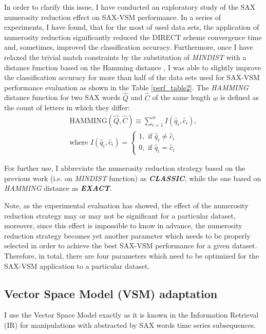 In order to clarify this issue, I have conducted an exploratory study of the SAX numerosity reduction 
effect on SAX-VSM performance. In a series of experiments, I have found, that for the most of used data sets, the application of 
numerosity reduction significantly reduced the DIRECT scheme convergence time and, sometimes, improved the classification accuracy. 
Furthermore, once I have relaxed the trivial match constraints by the substitution of 
\textit{MINDIST} with a distance function based on the Hamming distance \cite{hamming}, 
I was able to slightly improve the classification accuracy for more than half of the data sets used for \mbox{SAX-VSM}
performance evaluation as shown in the Table \ref{perf_table2}. 
The \textit{HAMMING} distance function for two SAX words $\hat{Q}$ and $\hat{C}$ of the same length $w$ 
is defined as the count of letters in which they differ:
\begin{equation}
\label{eq:hamming}
\begin{split}
\text{HAMMING}(\widehat{Q},\widehat{C}) \equiv \sum_{i=1}^{w} I( \widehat{q}_{i}, \widehat{c}_{i} ), \\
\text{where } I( \widehat{q}_{i}, \widehat{c}_{i} ) = 
\begin{cases}
 1,\text{ if } \widehat{q}_{i} \neq \widehat{c}_{i} \\
 0,\text{ if } \widehat{q}_{i} = \widehat{c}_{i}
\end{cases}
\end{split}                                                      
\end{equation}

For further use, I abbreviate the numerosity reduction strategy based on the previous work (i.e. on \textit{MINDIST} 
function) as \textit{\textbf{CLASSIC}}, while the one based on \textit{HAMMING} distance as \textit{\textbf{EXACT}}.

Note, as the experimental evaluation has showed, the effect of the numerosity reduction strategy may or may not be significant 
for a particular dataset, moreover, since this effect is impossible to know in advance, the numerosity reduction strategy becomes 
yet another parameter which needs to be properly selected in order to achieve the best SAX-VSM performance for a given dataset. 
Therefore, in total, there are four parameters which need to be optimized for the SAX-VSM application to a particular dataset.

\subsection{Vector Space Model (VSM) adaptation}\label{vsm}
I use the Vector Space Model exactly as it is known in the Information Retrieval (IR) \cite{citeulike:300428} for 
manipulations with abstracted by SAX words time series subsequences. 

